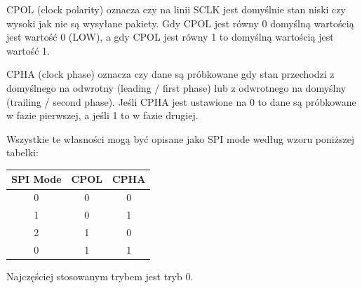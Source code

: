 \documentclass[11pt]{article}
\begin{document}
CPOL (clock polarity) oznacza czy na linii SCLK jest domyślnie stan niski czy wysoki
jak nie są wysyłane pakiety. Gdy CPOL jest równy 0 domyślną wartością jest wartość 0 (LOW),
a gdy CPOL jest równy 1 to domyślną wartością jest wartość 1.

CPHA (clock phase) oznacza czy dane są próbkowane gdy stan przechodzi z domyślnego na odwrotny (leading / first phase)
lub z odwrotnego na domyślny (trailing / second phase). Jeśli CPHA jest ustawione na 0 to dane
są próbkowane w fazie pierwszej, a jeśli 1 to w fazie drugiej.

Wszystkie te własności mogą być opisane jako SPI mode według wzoru poniższej tabelki:
\begin{table}[H]
    \centering
    \begin{tabular}{|c|c|c|}
        \hline
        SPI Mode & CPOL & CPHA \\
        \hline
        0 & 0 & 0 \\ \hline
        1 & 0 & 1 \\ \hline
        2 & 1 & 0 \\ \hline 
        0 & 1 & 1 \\
        \hline
    \end{tabular}
\end{table}
Najczęściej stosowanym trybem jest tryb 0.
\end{document}
